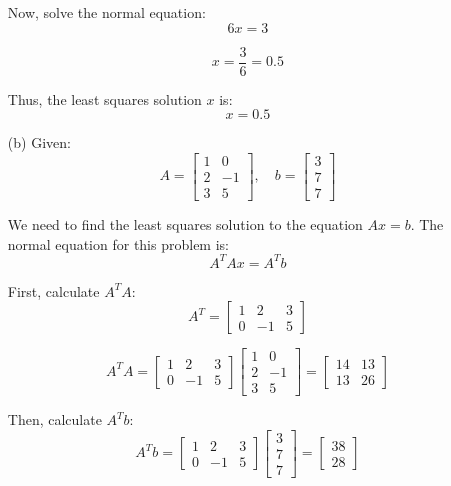 \documentclass[12pt]{article}
\begin{document}
\begin{enumerate}
    Now, solve the normal equation:
    \[
      6x = 3
    \]

    \[
      x = \frac{3}{6} = 0.5
    \]

    Thus, the least squares solution \( x \) is:
    \[
      x = 0.5
    \]

    \pagebreak

  \item[(b)]
    Given:
    \[
      A = \begin{bmatrix} 1 & 0 \\ 2 & -1 \\ 3 & 5 \end{bmatrix}, \quad b = \begin{bmatrix} 3 \\ 7 \\ 7 \end{bmatrix}
    \]

    We need to find the least squares solution to the equation \( Ax = b \). The normal equation for this problem is:
    \[
      A^T A x = A^T b
    \]

    First, calculate \( A^T A \):
    \[
      A^T = \begin{bmatrix} 1 & 2 & 3 \\ 0 & -1 & 5 \end{bmatrix}
    \]

    \[
      A^T A = \begin{bmatrix} 1 & 2 & 3 \\ 0 & -1 & 5 \end{bmatrix} \begin{bmatrix} 1 & 0 \\ 2 & -1 \\ 3 & 5 \end{bmatrix} = \begin{bmatrix} 14 & 13 \\ 13 & 26 \end{bmatrix}
    \]

    Then, calculate \( A^T b \):
    \[
      A^T b = \begin{bmatrix} 1 & 2 & 3 \\ 0 & -1 & 5 \end{bmatrix} \begin{bmatrix} 3 \\ 7 \\ 7 \end{bmatrix} = \begin{bmatrix} 38 \\ 28 \end{bmatrix}
    \]


\end{enumerate}
\end{document}
